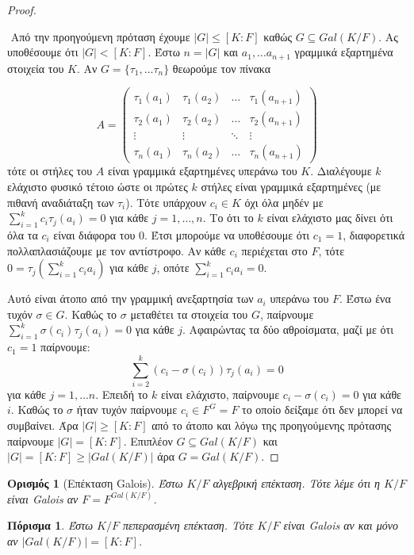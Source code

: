 \documentclass[oneside,a4paper]{article}
\newtheorem*{defn}{Ορισμός}
\newtheorem{cor}{Πόρισμα}
\newcommand {\tl}{\textlatin}
\begin{document}
\begin{proof} $ $

	$ $\newline
	Από την προηγούμενη πρόταση έχουμε $|G| \leq [K:F]$ καθώς $G\subseteq Gal(K/F)$. Ας υποθέσουμε ότι $|G| < [K:F]$. Έστω $n = |G|$ και $a_1 , \ldots a_{n+1}$ γραμμικά εξαρτημένα στοιχεία του $K$. Αν $G = \{\tau_1 ,\ldots \tau_n\}$ θεωρούμε τον πίνακα

	\[A = 
	\begin{pmatrix}
		\tau_1 (a_1) & \tau_1 (a_2) & \ldots  & \tau_1 (a_{n+1}) \\
		\tau_2 (a_1) & \tau_2 (a_2) & \ldots & \tau_2 (a_{n+1}) \\
		\vdots & \vdots & \ddots & \vdots \\
		\tau_n (a_1) & \tau_n (a_2) & \ldots & \tau_n (a_{n+1})
	\end{pmatrix}
	\]
	τότε οι στήλες του $A$ είναι γραμμικά εξαρτημένες υπεράνω του $K$. Διαλέγουμε $k$ ελάχιστο φυσικό τέτοιο ώστε οι πρώτες $k$ στήλες είναι γραμμικά εξαρτημένες (με πιθανή αναδιάταξη των $\tau_i$). Τότε υπάρχουν $c_i \in K$ όχι όλα μηδέν με $\sum\limits_{i=1}^k c_i \tau_j (a_i) = 0$ για κάθε $j=1,\ldots,n$. Το ότι το $k$ είναι ελάχιστο μας δίνει ότι όλα τα $c_i$ είναι διάφορα του $0$. Έτσι μπορούμε να υποθέσουμε ότι $c_1 = 1$, διαφορετικά πολλαπλασιάζουμε με τον αντίστροφο. Αν κάθε $c_i$ περιέχεται στο $F$, τότε $0 = \tau_j \left(\sum\limits_{i=1}^k c_i a_i\right) $ για κάθε $j$, οπότε $\sum\limits_{i=1}^k c_i a_i = 0$.

	Αυτό είναι άτοπο από την γραμμική ανεξαρτησία των $a_i$ υπεράνω του $F$. Έστω ένα τυχόν $\sigma \in G$. Καθώς το $\sigma$ μεταθέτει τα στοιχεία του $G$, παίρνουμε $\sum\limits_{i=1}^k \sigma (c_i) \tau_j(a_i) = 0$ για κάθε $j$. Αφαιρώντας τα δύο αθροίσματα, μαζί με ότι $c_1 = 1$ παίρνουμε:
	$$\sum\limits_{i=2}^k (c_i -\sigma (c_i))\tau_j (a_i) = 0 $$
	για κάθε $j =1,\ldots n$. Επειδή το $k$ είναι ελάχιστο, παίρνουμε $c_i - \sigma(c_i) = 0$ για κάθε $i$. Καθώς το $\sigma$ ήταν τυχόν παίρνουμε $c_i \in F^G = F$ το οποίο δείξαμε ότι δεν μπορεί να συμβαίνει. Άρα $|G| \geq [K:F]$ από το άτοπο και λόγω της προηγούμενης πρότασης παίρνουμε $|G| = [K:F]$. Επιπλέον $G \subseteq Gal(K/F)$ και $|G| = [K:F] \geq |Gal(K/F)|$ άρα $G = Gal(K/F)$.
\end{proof}
\vspace{0.1cm}
\begin{defn}[Επέκταση \tl{Galois}]
	Έστω $K/F$ αλγεβρική επέκταση. Τότε λέμε ότι η $K/F$ είναι \tl{Galois} αν $F = F^{Gal(K/F)}$.
\end{defn}
\vspace{0.1cm}
\begin{cor}
	Έστω $K/F$ πεπερασμένη επέκταση. Τότε $K/F$ είναι \tl{Galois} αν και μόνο αν $|Gal(K/F)| = [K:F]$.
\end{cor}
\end{document}
